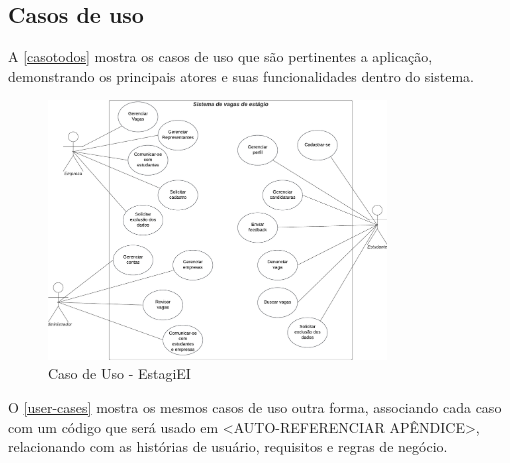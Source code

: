 \subsection{Casos de uso}

A \autoref{casotodos} mostra os casos de uso que são pertinentes a aplicação, demonstrando os principais atores e suas funcionalidades dentro do sistema.


\begin{figure}[H]
	\centering
	\caption{\label{casotodos}Caso de Uso - EstagiEI}
	\includegraphics[width=0.8\textwidth]{../imagens/caso-de-uso.png}
\end{figure}

O \autoref{user-cases} mostra os mesmos casos de uso outra forma, associando cada caso com um código que será usado em <AUTO-REFERENCIAR APÊNDICE>, relacionando com as histórias de usuário, requisitos e regras de negócio.

